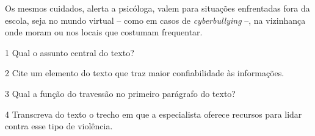 \begin{myquote}
Os mesmos cuidados, alerta a psicóloga, valem para situações enfrentadas
fora da escola, seja no mundo virtual -- como em casos de \textit{cyberbullying}
--, na vizinhança onde moram ou nos locais que costumam frequentar.


\end{myquote}

\num{1} Qual o assunto central do texto?


\num{2} Cite um elemento do texto que traz maior confiabilidade às informações.


\num{3} Qual a função do travessão no primeiro parágrafo do texto?


\num{4} Transcreva do texto o trecho em que a especialista oferece recursos
para lidar contra esse tipo de violência. 

